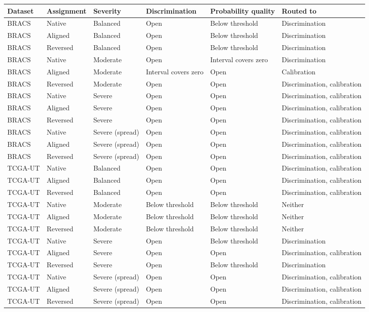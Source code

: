 \begin{tabular}{llllll}
\toprule
Dataset & Assignment & Severity & Discrimination & Probability quality & Routed to \\
\midrule
BRACS & Native & Balanced & Open & Below threshold & Discrimination \\
BRACS & Aligned & Balanced & Open & Below threshold & Discrimination \\
BRACS & Reversed & Balanced & Open & Below threshold & Discrimination \\
BRACS & Native & Moderate & Open & Interval covers zero & Discrimination \\
BRACS & Aligned & Moderate & Interval covers zero & Open & Calibration \\
BRACS & Reversed & Moderate & Open & Open & Discrimination, calibration \\
BRACS & Native & Severe & Open & Open & Discrimination, calibration \\
BRACS & Aligned & Severe & Open & Open & Discrimination, calibration \\
BRACS & Reversed & Severe & Open & Open & Discrimination, calibration \\
BRACS & Native & Severe (spread) & Open & Open & Discrimination, calibration \\
BRACS & Aligned & Severe (spread) & Open & Open & Discrimination, calibration \\
BRACS & Reversed & Severe (spread) & Open & Open & Discrimination, calibration \\
TCGA-UT & Native & Balanced & Open & Open & Discrimination, calibration \\
TCGA-UT & Aligned & Balanced & Open & Open & Discrimination, calibration \\
TCGA-UT & Reversed & Balanced & Open & Open & Discrimination, calibration \\
TCGA-UT & Native & Moderate & Below threshold & Below threshold & Neither \\
TCGA-UT & Aligned & Moderate & Below threshold & Below threshold & Neither \\
TCGA-UT & Reversed & Moderate & Below threshold & Below threshold & Neither \\
TCGA-UT & Native & Severe & Open & Below threshold & Discrimination \\
TCGA-UT & Aligned & Severe & Open & Open & Discrimination, calibration \\
TCGA-UT & Reversed & Severe & Open & Below threshold & Discrimination \\
TCGA-UT & Native & Severe (spread) & Open & Open & Discrimination, calibration \\
TCGA-UT & Aligned & Severe (spread) & Open & Open & Discrimination, calibration \\
TCGA-UT & Reversed & Severe (spread) & Open & Open & Discrimination, calibration \\
\bottomrule
\end{tabular}
